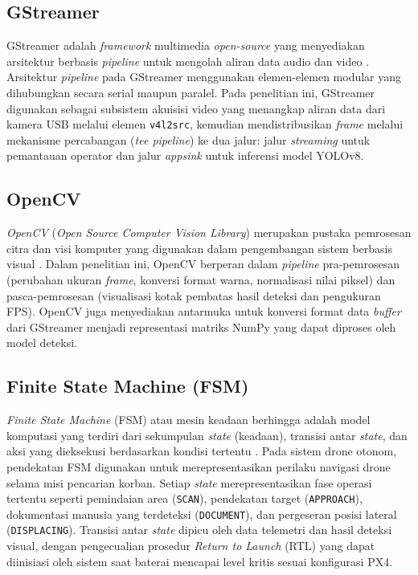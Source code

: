\subsection{GStreamer}
GStreamer adalah \textit{framework} multimedia \textit{open-source} yang menyediakan arsitektur berbasis \textit{pipeline} untuk mengolah aliran data audio dan video \cite{GStreamer2024}. Arsitektur \textit{pipeline} pada GStreamer menggunakan elemen-elemen modular yang dihubungkan secara serial maupun paralel. Pada penelitian ini, GStreamer digunakan sebagai subsistem akuisisi video yang menangkap aliran data dari kamera USB melalui elemen \texttt{v4l2src}, kemudian mendistribusikan \textit{frame} melalui mekanisme percabangan (\textit{tee pipeline}) ke dua jalur: jalur \textit{streaming} untuk pemantauan operator dan jalur \textit{appsink} untuk inferensi model YOLOv8.

\subsection{OpenCV}
\textit{OpenCV} (\textit{Open Source Computer Vision Library}) merupakan pustaka pemrosesan citra dan visi komputer yang digunakan dalam pengembangan sistem berbasis visual \cite{Bradski2000OpenCV, song2022_performance_opencv}. Dalam penelitian ini, OpenCV berperan dalam \textit{pipeline} pra-pemrosesan (perubahan ukuran \textit{frame}, konversi format warna, normalisasi nilai piksel) dan pasca-pemrosesan (visualisasi kotak pembatas hasil deteksi dan pengukuran FPS). OpenCV juga menyediakan antarmuka untuk konversi format data \textit{buffer} dari GStreamer menjadi representasi matriks NumPy yang dapat diproses oleh model deteksi.

\subsection{Finite State Machine (FSM)}
\textit{Finite State Machine} (FSM) atau mesin keadaan berhingga adalah model komputasi yang terdiri dari sekumpulan \textit{state} (keadaan), transisi antar \textit{state}, dan aksi yang dieksekusi berdasarkan kondisi tertentu \cite{Wagner2006FSM}. Pada sistem drone otonom, pendekatan FSM digunakan untuk merepresentasikan perilaku navigasi drone selama misi pencarian korban. Setiap \textit{state} merepresentasikan fase operasi tertentu seperti pemindaian area (\texttt{SCAN}), pendekatan target (\texttt{APPROACH}), dokumentasi manusia yang terdeteksi (\texttt{DOCUMENT}), dan pergeseran posisi lateral (\texttt{DISPLACING}). Transisi antar \textit{state} dipicu oleh data telemetri dan hasil deteksi visual, dengan pengecualian prosedur \textit{Return to Launch} (RTL) yang dapat diinisiasi oleh sistem saat baterai mencapai level kritis sesuai konfigurasi PX4.

